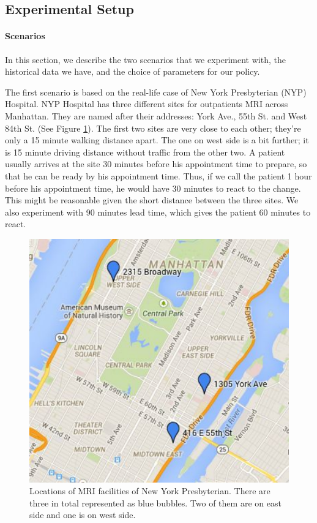 \subsection{Experimental Setup}

\paragraph{Scenarios}

In this section, we describe the two scenarios that we experiment with,
the historical data we have, and the choice of parameters for our policy.

The first scenario is based on the real-life case of New York Presbyterian
(NYP) Hospital. NYP Hospital has three different sites for outpatients MRI
across Manhattan. They are named after their addresses: York Ave., 55th St. and
West 84th St. (See Figure \ref{fig:site}). The first two sites are very
close to each other; they're only a 15 minute walking distance apart. The one on west side
is a bit further; it is 15 minute driving distance without traffic from the other two.
A patient usually arrives at the site 30 minutes before his appointment
time to prepare, so that he can be ready by his appointment time.
Thus, if we call the patient 1 hour before his appointment time, he
would have 30 minutes to react to the change. This might be reasonable
given the short distance between the three sites. We also experiment with 90 minutes
lead time, which gives the patient 60 minutes to react.

\begin{figure}
\centering
\includegraphics[scale=.6]{chap3/numeric/pic/site.pdf}
\caption{Locations of MRI facilities of New York Presbyterian. There
are three in total represented as blue bubbles. Two of them are on
east side and one is on west side.}
\label{fig:site}
\end{figure}

